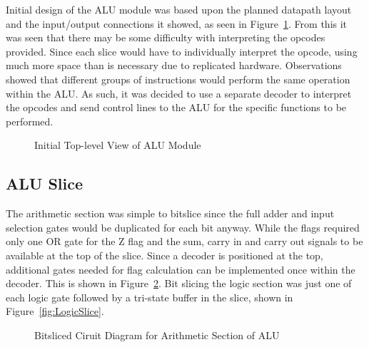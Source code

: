 Initial design of the ALU module was based upon the planned datapath layout and the input/output connections it showed, as seen in Figure~\ref{fig:BasicALUSym}. 
From this it was seen that there may be some difficulty with interpreting the opcodes provided. 
Since each slice would have to individually interpret the opcode, using much more space than is necessary due to replicated hardware. 
Observations showed that different groups of instructions would perform the same operation within the ALU. 
As such, it was decided to use a separate decoder to interpret the opcodes and send control lines to the ALU for the specific functions to be performed. 

\begin{figure}[h]
	\caption{Initial Top-level View of ALU Module}
	\label{fig:BasicALUSym}
\end{figure}

\subsection{ALU Slice}
The arithmetic section was simple to bitslice since the full adder and input selection gates would be duplicated for each bit anyway. 
While the flags required only one OR gate for the Z flag and the sum, carry in and carry out signals to be available at the top of the slice. 
Since a decoder is positioned at the top, additional gates needed for flag calculation can be implemented once within the decoder. 
This is shown in Figure~\ref{fig:ArithSlice}. 
Bit slicing the logic section was just one of each logic gate followed by a tri-state buffer in the slice, shown in Figure~\ref{fig:LogicSlice}. 


\begin{figure}[h]
	\caption{Bitsliced Ciruit Diagram for Arithmetic Section of ALU}
	\label{fig:ArithSlice}
\end{figure}


